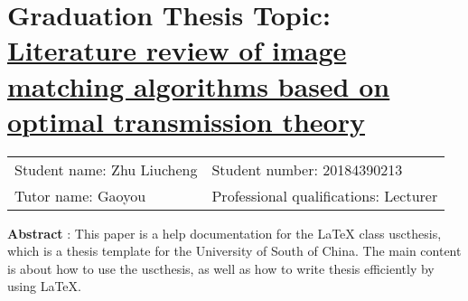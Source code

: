 \intobmk\section*{\textbf{Graduation Thesis Topic:}  \uline{Literature review of image matching algorithms based on optimal transmission theory}}

\begin{tabular}{ll}\centering
    Student name: Zhu Liucheng     &    Student number: 20184390213 \\
    Tutor name:   Gaoyou           &    Professional qualifications: Lecturer
\end{tabular}

\vspace*{20pt}

\noindent
\textbf{Abstract} : This paper is a help documentation for the \LaTeX{} class uscthesis, which is  a thesis template for the University of South of China. The main content is about how to use the uscthesis, as well as how to write thesis efficiently by using \LaTeX{}.

